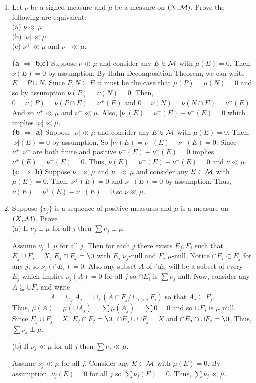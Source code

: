\begin{enumerate}
\item Let $\nu$ be a signed measure and $\mu$ be a measure on $(X, {\mathcal M})$. Prove the following are equivalent:
\\
(a) $\nu \ll \mu$ \\
(b) $|\nu|\ll \mu$ \\
(c) $\nu^+ \ll \mu$ and $\nu^- \ll \mu$.
\begin{pf}
\textbf{(a $\Rightarrow$ b,c)} Suppose $\nu \ll \mu$ and consider any $E \in {\mathcal M}$ with $\mu(E)=0$. Then, $\nu(E)=0$ by assumption. By Hahn Decomposition Theorem, we can write $E = P \cup N$. Since $P, N \subseteq E$ it must be the case that $\mu(P)=\mu(N)=0$ and so by assumption $\nu(P)=\nu(N)=0$. Then, $0=\nu(P) = \nu(P \cap E)=\nu^+(E)$ and $0=\nu(N)=\nu(N \cap E)=\nu^-(E)$. And so $\nu^+ \ll \mu$ and $\nu^- \ll \mu$. Also, $|\nu|(E)=\nu^+(E) + \nu^-(E)=0$ which implies $|\nu|\ll \mu$.
\\
\textbf{(b $\Rightarrow$ a)} Suppose $|\nu| \ll \mu$ and consider any $E \in {\mathcal M}$ with $\mu(E)=0$. Then, $|\nu|(E)=0$ by assumption. So $|\nu|(E)=\nu^+(E) + \nu^-(E) =0$. Since $\nu^+, \nu^-$ are both finite and positive $\nu^+(E) + \nu^-(E) =0$ implies $\nu^+(E)= \nu^-(E) =0$. Thus, $\nu(E)=\nu^+(E) - \nu^-(E)=0$ and $\nu \ll \mu$.
\\
\textbf{(c $\Rightarrow$ b)} Suppose $\nu^+ \ll \mu$ and $\nu^- \ll \mu$ and consider any $E \in {\mathcal M}$ with $\mu(E)=0$. Then, $\nu^+(E)=0$ and $\nu^-(E)=0$ by assumption. Thus, $\nu(E)= \nu^+(E)-\nu^-(E)=0$ so $\nu \ll \mu$.

\end{pf}
\item Suppose $\{v_j\}$ is a sequence of positive measures and $\mu$ is a measure on $(X, {\mathcal M})$. Prove\\
(a) If $\nu_j \perp \mu$ for all $j$ then $\sum \nu_j \perp \mu$.
\begin{pf}
	Assume $\nu_j \perp \mu$ for all $j$. Then for each $j$ there exists $E_j, F_j$ such that $E_j \cup F_j=X$, $E_j \cap F_j = \O$ with $E_j$ $\nu_j$-null and $F_j$ $\mu$-null. Notice $\cap E_i \subset E_j$ for any $j$, so $\nu_j(\cap E_i)=0$. Also any subset $A$ of $\cap E_i$ will be a subset of every $E_j$ which implies $\nu_j(A)=0$ for all $j$ so $\cap E_i$ is $\sum \nu_j$ null. Now, consider any $A \subseteq \cup F_j$ and write \[
	A= \cup_j A_j= \cup_j\left(A \cap F_j \slash \cup_{i > j}F_i  \right) \text{ so that } A_j \subseteq F_j.
	\]
	Thus, $\mu(A)=\mu(\cup A_j) = \sum \mu(A_j)=\sum 0 = 0$ and so $\cup F_j$ is $\mu$ null. Since $E_j \cup F_j=X$, $E_j \cap F_j = \O$, $\cap E_j \cup \cup F_j = X$ and $\cap E_j \cap \cup F_j = \O$. Thus, $\sum \nu_j \perp \mu$.
\end{pf}
(b) If $\nu_j \ll \mu$ for all $j$ then $\sum \nu_j \ll \mu$.
	\begin{pf}
Assume $\nu_j \ll \mu$ for all $j$. Consider any $E \in {\mathcal M}$ with $\mu(E)=0$. By assumption, $\nu_j(E)=0$ for all $j$ so $\sum \nu_j(E)=0$. Thus, $\sum \nu_j \ll \mu$.
\end{pf}
\end{enumerate}
